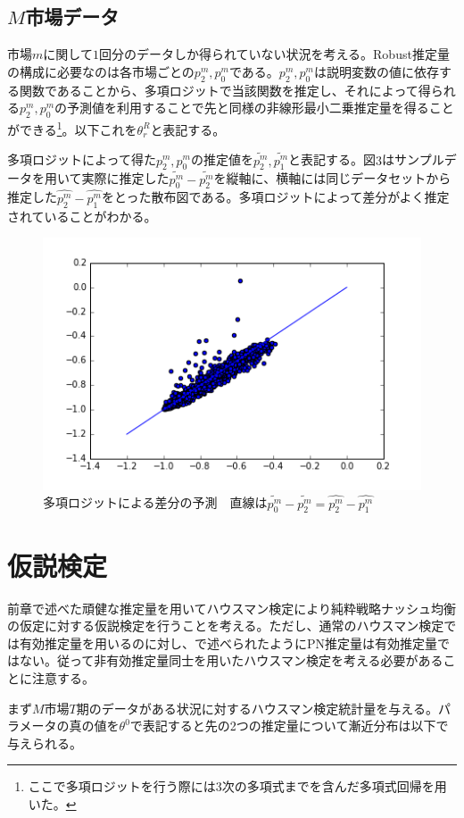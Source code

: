 \subsection{$M$市場データ}
市場$m$に関して$1$回分のデータしか得られていない状況を考える。Robust推定量の構成に必要なのは各市場ごとの$p_2^m,p_0^m$である。$p_2^m,p_0^m$は説明変数の値に依存する関数であることから、多項ロジットで当該関数を推定し、それによって得られる$p_2^m,p_0^m$の予測値を利用することで先と同様の非線形最小二乗推定量を得ることができる\footnote{ここで多項ロジットを行う際には3次の多項式までを含んだ多項式回帰を用いた。}。以下これを$\theta_r^R$と表記する。

多項ロジットによって得た$p_2^m,p_0^m$の推定値を$\tilde{p_2^m}, \tilde{p_1^m}$と表記する。図$3$はサンプルデータを用いて実際に推定した$\tilde{p_0^m} - \tilde{p_2^m}$を縦軸に、横軸には同じデータセットから推定した$\hat{p_2^m} - \hat{p_1^m}$をとった散布図である。多項ロジットによって差分がよく推定されていることがわかる。

\begin{figure}[t]
\centering
\includegraphics{logit.png}
\caption{多項ロジットによる差分の予測　直線は$\tilde{p_0^m} - \tilde{p_2^m} = \hat{p_2^m} - \hat{p_1^m}$}
\end{figure}

\section{仮説検定}
前章で述べた頑健な推定量を用いてハウスマン検定により純粋戦略ナッシュ均衡の仮定に対する仮説検定を行うことを考える。ただし、通常のハウスマン検定では有効推定量を用いるのに対し、\cite{Tamer2003a}で述べられたようにPN推定量は有効推定量ではない。従って非有効推定量同士を用いたハウスマン検定を考える必要があることに注意する。

まず$M$市場$T$期のデータがある状況に対するハウスマン検定統計量を与える。パラメータの真の値を$\theta^0$で表記すると先の2つの推定量について漸近分布は以下で与えられる。

